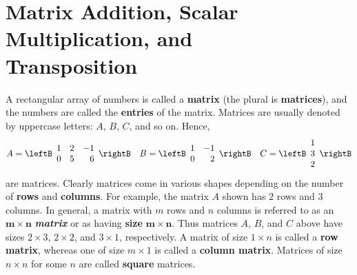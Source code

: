 \section[Matrix Addition, Scalar Multiplication, and Transposition]{Matrix Addition, Scalar Multiplication, and \\ Transposition}
\label{sec:2_1}

A rectangular array of numbers is called a \textbf{matrix} (the plural is \textbf{matrices}), and the numbers are called the \textbf{entries} of the matrix. Matrices are usually denoted by uppercase letters: $A$, $B$, $C$, and so on. Hence,
\begin{equation*}
A = \leftB \begin{array}{rrr}
1 & 2 & -1 \\
0 & 5 & 6
\end{array} \rightB \quad
B = \leftB \begin{array}{rr}
1 & -1 \\
0 & 2
\end{array} \rightB \quad
C = \leftB \begin{array}{r}
1 \\
3 \\
2
\end{array} \rightB
\end{equation*}
are matrices. Clearly matrices come in various shapes depending on the number of \textbf{rows} and \textbf{columns}. For example, the matrix $A$ shown has $2$ rows and $3$ columns. In general, a matrix with $m$ rows and $n$ columns is referred to as an $\bm{m} \times \bm{n}$ \textbf{\textit{matrix}} or as having \textbf{size} $\bm{m} \times \bm{n}$. Thus matrices $A$, $B$, and $C$ above have sizes $2 \times 3$, $2 \times 2$, and $3 \times 1$, respectively. A matrix of size $1 \times n$ is called a \textbf{row matrix}, whereas one of size $m \times 1$ is called a \textbf{column matrix}. Matrices of size $n \times n$ for some $n$ are called \textbf{square} matrices.

